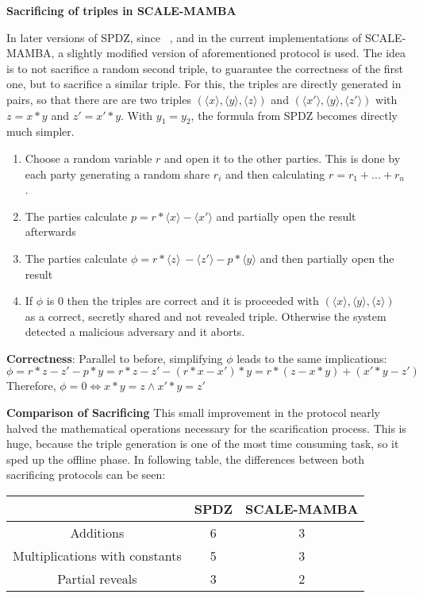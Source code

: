 \documentclass[english,runningheads,a4paper]{llncs}[2018/03/10]
\begin{document}
\textbf{Sacrificing of triples in SCALE-MAMBA}

In later versions of SPDZ, since ~\cite{cryptoeprint:2017:123}, and in the current implementations of SCALE-MAMBA, a slightly modified version of aforementioned protocol is used. The idea is to not sacrifice a random second triple, to guarantee the correctness of the first one, but to sacrifice a similar triple. For this, the triples are directly generated in pairs, so that there are are two triples \( (\langle x \rangle ,\langle y \rangle , \langle z \rangle ) \) and \( (\langle x' \rangle ,\langle y\rangle , \langle z'\rangle ) \) with $z=x*y$ and $z'=x'*y$. With $y_1=y_2$, the formula from SPDZ becomes directly much simpler.
\begin{enumerate}
\item Choose a random variable \( r\) and open it to the other parties. This is done by each party generating a random share \(r_i\) and then calculating \(r=r_1+...+r_n\).
\item The parties calculate  \( p=r*\langle x \rangle - \langle x' \rangle \) and partially open the result afterwards
\item The parties calculate \(\phi = r * \langle z \rangle\ - \langle z' \rangle - p * \langle y \rangle\) and then partially open the result
\item If \( \phi \) is 0 then the triples are correct and it is proceeded with \( (\langle x \rangle ,\langle y\rangle , \langle z\rangle )\) as a correct, secretly shared and not revealed triple. Otherwise the system detected a malicious adversary and it aborts.\\
\end{enumerate}

\textbf{Correctness}: Parallel to before, simplifying \( \phi \) leads to the same implications:\\
$$\phi =r*z-z'-p*y=r*z-z'-(r*x-x')*y=r*(z-x*y)+(x'*y-z')$$
Therefore, \( \phi = 0 \Leftrightarrow x * y = z \land x'*y=z' \)


\textbf{Comparison of Sacrificing}
This small improvement in the protocol nearly halved the mathematical operations necessary for the scarification process. This is huge, because the triple generation is one of the most time consuming task, so it sped up the offline phase. In following table, the differences between both sacrificing protocols can be seen:



\begin{center}
\begin{tabular}{ | c | c | c | }
\hline
& SPDZ & SCALE-MAMBA \\
\hline
 Additions & 6 & 3 \\ 
\hline
 Multiplications with constants & 5 & 3 \\  
\hline
Partial reveals & 3 &2 \\
\hline
\end{tabular}
\end{center}
\end{document}
